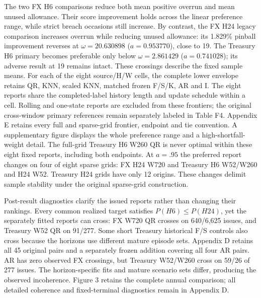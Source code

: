 \documentclass[10pt,a4paper]{article}
\begin{document}
The two FX H6 comparisons reduce both mean positive overrun and mean unused allowance. Their score improvement holds across the linear preference range, while strict breach occasions still increase. By contrast, the FX H24 legacy comparison increases overrun while reducing unused allowance: its 1.829\% pinball improvement reverses at \(\omega=20.630898\) (\(a=0.953770\)), close to 19. The Treasury H6 primary becomes preferable only below \(\omega=2.861429\) (\(a=0.741028\)); its adverse result at 19 remains intact. These crossings describe the fixed sample means. For each of the eight source/H/W cells, the complete lower envelope retains QR, KNN, scaled KNN, matched frozen F/S/K, AR and I. The eight reports share the completed-label history length and update schedule within a cell. Rolling and one-state reports are excluded from these frontiers; the original cross-window primary references remain separately labeled in Table F4. Appendix E retains every full and sparse-grid frontier, endpoint and tie convention. A supplementary figure displays the whole preference range and a high-shortfall-weight detail. The full-grid Treasury H6 W260 QR is never optimal within these eight fixed reports, including both endpoints. At \(a=.95\) the preferred report changes on four of eight sparse grids: FX H24 W720 and Treasury H6 W52/W260 and H24 W52. Treasury H24 grids have only 12 origins. These changes delimit sample stability under the original sparse-grid construction.

Post-result diagnostics clarify the issued reports rather than changing their rankings. Every common realized target satisfies \(P(H6)\le P(H24)\), yet the separately fitted reports can cross: FX W720 QR crosses on 640/6,625 issues, and Treasury W52 QR on 91/277. Some short Treasury historical F/S controls also cross because the horizons use different mature episode sets. Appendix D retains all 45 original pairs and a separately frozen addition covering all four AR pairs. AR has zero observed FX crossings, but Treasury W52/W260 cross on 59/26 of 277 issues. The horizon-specific fits and mature scenario sets differ, producing the observed incoherence. Figure 3 retains the complete annual comparison; all detailed coherence and fixed-terminal diagnostics remain in Appendix D.
\end{document}
